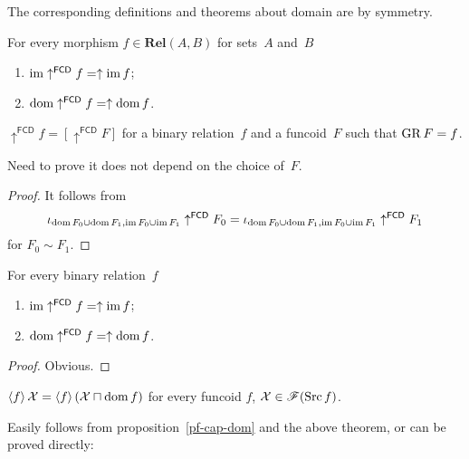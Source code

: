 The corresponding definitions and theorems about domain are by symmetry.

\begin{obvious}
For every morphism $f\in\mathbf{Rel}(A,B)$ for sets~$A$ and~$B$
\begin{enumerate}
\item $\operatorname{im}\uparrow^{\mathsf{FCD}}f=\uparrow\operatorname{im} f$;
\item $\operatorname{dom}\uparrow^{\mathsf{FCD}}f=\uparrow\operatorname{dom} f$.
\end{enumerate}
\end{obvious}

\begin{defn}
$\uparrow^{\mathsf{FCD}}f=[\uparrow^{\mathsf{FCD}}F]$ for a binary relation~$f$ and a funcoid~$F$ such that $\operatorname{GR} F=f$.
\end{defn}

Need to prove it does not depend on the choice of~$F$.

\begin{proof}
It follows from
\[
\iota_{\operatorname{dom} F_0\cup\operatorname{dom} F_1,\operatorname{im} F_0\cup\operatorname{im} F_1}\uparrow^{\mathsf{FCD}}F_0=\\
\iota_{\operatorname{dom} F_0\cup\operatorname{dom} F_1,\operatorname{im} F_0\cup\operatorname{im} F_1}\uparrow^{\mathsf{FCD}}F_1
\]
for $F_0\sim F_1$.
\end{proof}

\begin{prop}
For every binary relation~$f$
\begin{enumerate}
\item $\operatorname{im}\uparrow^{\mathsf{FCD}}f=\uparrow\operatorname{im} f$;
\item $\operatorname{dom}\uparrow^{\mathsf{FCD}}f=\uparrow\operatorname{dom} f$.
\end{enumerate}
\end{prop}

\begin{proof}
Obvious.
\end{proof}

\begin{prop}
$\left\langle f\right\rangle\mathcal{X}=\left\langle f\right\rangle(\mathcal{X}\sqcap\operatorname{dom} f)$ for every
funcoid $f$, $\mathcal{X}\in\mathscr{F}(\operatorname{Src} f)$.
\end{prop}

Easily follows from proposition~\ref{pf-cap-dom} and the above theorem, or can be proved directly:

